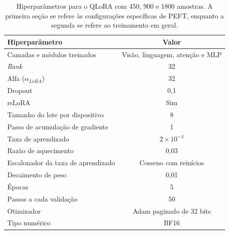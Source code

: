 \begin{table}[ht]
    \caption{\small Hiperparâmetros para o \ac{QLoRA} com 450, 900 e 1800 amostras. A primeira seção se refere às
    configurações
    específicas de \ac{PEFT}, enquanto a
    segunda se refere ao treinamento em geral.}
    \centering
    \begin{tabular}{l|c}
        \hline
        Hiperparâmetro                             & Valor                                  \\ \hline
        Camadas e módulos treinados                & Visão, linguagem, atenção e \ac{MLP}   \\
        \textit{Rank}                              & 32                                     \\
        Alfa (\begin{math}\alpha_{LoRA}\end{math}) & 32                                     \\
        Dropout                                    & 0,1                                    \\
        \ac{rsLoRA}                                & Sim                                    \\ \hline
        Tamanho do lote por dispositivo            & 8                                      \\
        Passo de acumulação de gradiente           & 1                                      \\
        Taxa de aprendizado                        & \begin{math}2 \times 10^{-4}\end{math} \\
        Razão de aquecimento                       & 0,03                                   \\
        Escalonador da taxa de aprendizado         & Cosseno com reinícios                  \\
        Decaimento de peso                         & 0,01                                   \\
        Épocas                                     & 5                                      \\
        Passos a cada validação                    & 50                                     \\
        Otimizador                                 & \ac{Adam} paginado de 32 bits          \\
        Tipo numérico                              & \ac{BF16}                              \\ \hline
    \end{tabular}
    \label{tab:qlora_500_config}
\end{table}

